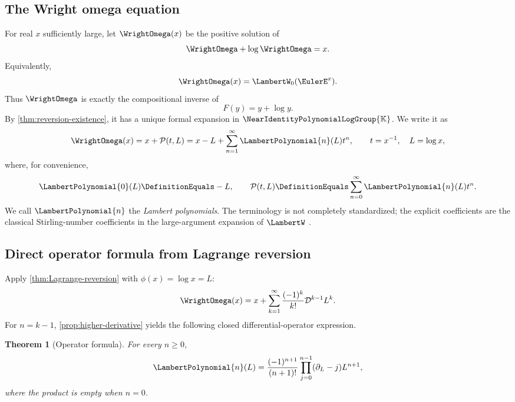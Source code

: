 \documentclass[11pt]{article}
\theoremstyle{pltheorem}
\newtheorem{theorem}{Theorem}[section]
\newcommand{\K}{\mathbb K}
\newcommand{\Gnear}{\NearIdentityPolynomialLogGroup{\K}}
\newcommand{\D}{\mathcal D}
\begin{document}
\subsection{The Wright omega equation}

For real \(x\) sufficiently large, let \(\WrightOmega(x)\) be the positive solution of
\begin{equation}\label{eq:omega-equation}
 \WrightOmega+\log\WrightOmega=x.
\end{equation}
Equivalently,
\begin{equation}\label{eq:omega-W}
 \WrightOmega(x)=\LambertW_0(\EulerE^x).
\end{equation}
Thus \(\WrightOmega\) is exactly the compositional inverse of
\begin{equation}\label{eq:F-log-map}
 F(y)=y+\log y.
\end{equation}
By \cref{thm:reversion-existence}, it has a unique formal expansion in \(\Gnear\).  We write it as
\begin{equation}\label{eq:omega-expansion}
 \WrightOmega(x)=x+\mathcal P(t,L)
 =x-L+\sum_{n=1}^{\infty}\LambertPolynomial{n}(L)t^n,
 \qquad t=x^{-1},\quad L=\log x,
\end{equation}
where, for convenience,
\begin{equation}\label{eq:P0-def}
 \LambertPolynomial{0}(L)\DefinitionEquals-L,
 \qquad
 \mathcal P(t,L)\DefinitionEquals\sum_{n=0}^{\infty}\LambertPolynomial{n}(L)t^n.
\end{equation}
We call \(\LambertPolynomial{n}\) the \emph{Lambert polynomials}.  The terminology is not completely standardized; the explicit coefficients are the classical Stirling-number coefficients in the large-argument expansion of \(\LambertW\) \cite{comtet1970,jeffrey-et-al-1995,corless-et-al-1996,dlmf-W}.

\subsection{Direct operator formula from Lagrange reversion}

Apply \cref{thm:Lagrange-reversion} with \(\phi(x)=\log x=L\):
\begin{equation}\label{eq:omega-Lagrange}
 \WrightOmega(x)=x+
 \sum_{k=1}^{\infty}\frac{(-1)^k}{k!}
 \D^{k-1}L^k.
\end{equation}
For \(n=k-1\), \cref{prop:higher-derivative} yields the following closed differential-operator expression.

\begin{theorem}[Operator formula]\label{thm:P-operator}
For every \(n\ge0\),
\begin{equation}\label{eq:P-operator}
 \LambertPolynomial{n}(L)=\frac{(-1)^{n+1}}{(n+1)!}
 \prod_{j=0}^{n-1}(\partial_L-j)L^{n+1},
\end{equation}
where the product is empty when \(n=0\).
\end{theorem}
\end{document}
